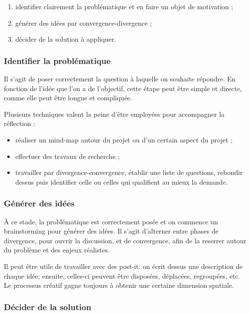 \begin{enumerate}
    \item identifier clairement la problématique et en faire un objet de motivation ;
    \item générer des idées par convergence-divergence ;
    \item décider de la solution à appliquer.
\end{enumerate}

\subsubsection{Identifier la problématique}

Il s'agit de poser correctement la question à laquelle on souhaite répondre. En fonction de l'idée que l'on a de l'objectif, cette étape peut être simple et directe, comme elle peut être longue et compliquée.

Plusieurs techniques valent la peine d'être employées pour accompagner la réflection :
\begin{itemize}
    \item réaliser un mind-map autour du projet ou d'un certain aspect du projet ;
    \item effectuer des travaux de recherche ;
    \item travailler par divergence-convergence, établir une liste de questions, rebondir dessus puis identifier celle ou celles qui qualifient au mieux la demande.
\end{itemize}

\subsubsection{Générer des idées}

À ce stade, la problématique est correctement posée et on commence un brainstorming pour générer des idées. Il s'agit d'alterner entre phases de divergence, pour ouvrir la discussion, et de convergence, afin de la reserrer autour du problème et des enjeux réalistes.

Il peut être utile de travailler avec des post-it: on écrit dessus une description de chaque idée; ensuite, celles-ci peuvent être disposées, déplacées, regroupées, etc. Le processus créatif gagne toujours à obtenir une certaine dimension spatiale.

\subsubsection{Décider de la solution}

